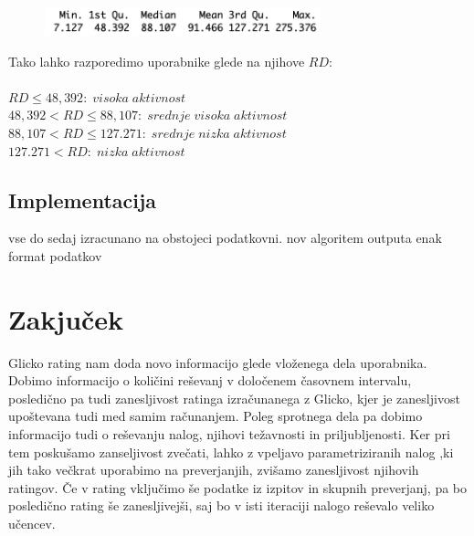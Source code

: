 \documentclass{IEEEtran}
\makeatletter
\let\old@subsection\subsection
\renewcommand{\subsection}[1]{\bigskip\old@subsection{#1}\@afterindentfalse\@afterheading}
\makeatother
\begin{document}
\begin{figure}[h!]
    \includegraphics[width=8cm]{RDstat}
    \label{fig:example}%
\end{figure}

Tako lahko razporedimo uporabnike glede na njihove $RD$:
\hfill
\\
\\
$RD\leq48,392:\;visoka\;aktivnost$
\hfill
\\
$48,392<RD\leq88,107:\;srednje\;visoka\;aktivnost$
\hfill
\\
$88,107<RD\leq127.271:\;srednje\;nizka\;aktivnost$
\hfill
\\
$127.271<RD:\;nizka\;aktivnost$
\hfill


\subsection{Implementacija}

vse do sedaj izracunano na obstojeci podatkovni. nov algoritem outputa enak format podatkov

\section{Zakjuček}
\label{sec:cnc}

Glicko rating nam doda novo informacijo glede vloženega dela uporabnika. Dobimo informacijo o količini reševanj v določenem časovnem intervalu, posledično pa tudi zanesljivost ratinga izračunanega z Glicko, kjer je zanesljivost upoštevana tudi med samim računanjem. Poleg sprotnega dela pa dobimo informacijo tudi o reševanju nalog, njihovi težavnosti in priljubljenosti. Ker pri tem poskušamo zanseljivost zvečati, lahko z vpeljavo parametriziranih nalog
,ki jih tako večkrat uporabimo na preverjanjih, zvišamo zanesljivost njihovih ratingov. Če v rating vključimo še podatke iz izpitov in skupnih preverjanj, pa bo posledično rating še zanesljivejši, saj bo v isti iteraciji nalogo reševalo veliko učencev.

\hfill
\\
\\





\end{document}
